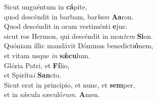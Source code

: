 \evenverse Sicut unguéntum in \textbf{cá}pite,~\*\\
\evenverse quod descéndit in barbam, bar\textit{bam} \textbf{A}\textbf{a}ron.\\
\oddverse Quod descéndit in oram vestiménti \textbf{e}jus:~\*\\
\oddverse sicut ros Hermon, qui descéndit in mon\textit{tem} \textbf{Si}on.\\
\evenverse Quóniam illic mandávit Dóminus benedicti\textbf{ó}nem,~\*\\
\evenverse et vitam usque \textit{in} \textbf{sǽ}\textbf{cu}lum.\\
\oddverse Glória Patri, et \textbf{Fí}lio,~\*\\
\oddverse et Spirítu\textit{i} \textbf{San}cto.\\
\evenverse Sicut erat in princípio, et nunc, et \textbf{sem}per,~\*\\
\evenverse et in sǽcula sæculó\textit{rum}. \textbf{A}men.\\
